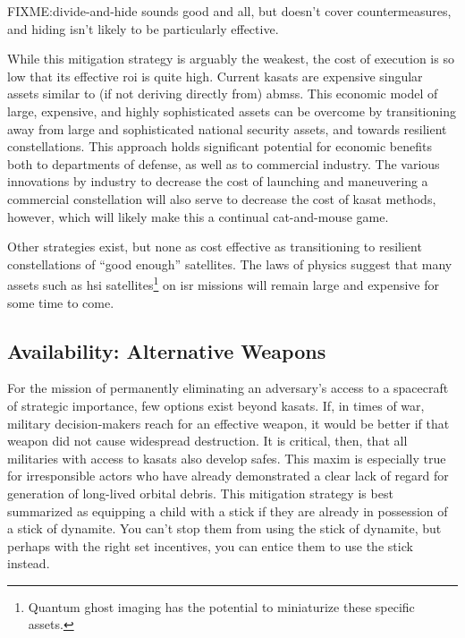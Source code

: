 FIXME:divide-and-hide sounds good and all, but doesn't cover
countermeasures, and hiding isn't likely to be particularly effective.

While this mitigation strategy is arguably the weakest, the cost of
execution is so low that its effective \ac{roi} is quite high.
Current \acp{kasat} are expensive singular assets similar to (if not
deriving directly from) \acp{abms}.  This economic model of large,
expensive, and highly sophisticated assets can be overcome by
transitioning away from large and sophisticated national security
assets, and towards resilient constellations.  This approach holds
significant potential for economic benefits both to departments of
defense, as well as to commercial industry.\cite{big-risks} The
various innovations by industry to decrease the cost of launching and
maneuvering a commercial constellation will also serve to decrease the
cost of \ac{kasat} methods, however, which will likely make this a
continual cat-and-mouse game.

Other strategies exist, but none as cost effective as transitioning to
resilient constellations of ``good enough'' satellites.  The laws of
physics suggest that many assets such as \ac{hsi}
satellites\footnote{Quantum ghost imaging has the potential to
miniaturize these specific assets.} on \ac{isr} missions will remain
large and expensive for some time to come.

\subsection*{Availability: Alternative Weapons}
For the mission of permanently eliminating an adversary's access to a
spacecraft of strategic importance, few options exist beyond
\acp{kasat}.  If, in times of war, military decision-makers reach for
an effective weapon, it would be better if that weapon did not cause
widespread destruction.  It is critical, then, that all militaries
with access to \acp{kasat} also develop \acp{safe}.  This maxim is
especially true for irresponsible actors who have already demonstrated
a clear lack of regard for generation of long-lived orbital debris.
This mitigation strategy is best summarized as equipping a child with
a stick if they are already in possession of a stick of dynamite.  You
can't stop them from using the stick of dynamite, but perhaps with the
right set incentives, you can entice them to use the stick instead.


